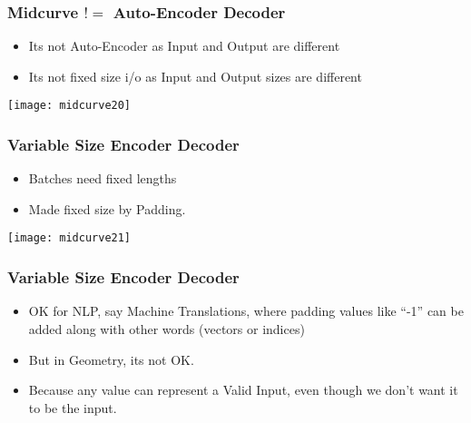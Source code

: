 \begin{frame}[fragile]\frametitle{Midcurve $!=$ Auto-Encoder Decoder}

	\begin{itemize}
	\item Its not Auto-Encoder as Input and Output are different
	\item Its not fixed size i/o as Input and Output sizes are different
	\end{itemize}
\begin{center}
\texttt{[image: midcurve20]}
\end{center}	
\end{frame}

\begin{frame}[fragile]\frametitle{Variable Size Encoder Decoder}

	\begin{itemize}
	\item Batches need fixed lengths
	\item Made fixed size by Padding.
	\end{itemize}
\begin{center}
\texttt{[image: midcurve21]}
\end{center}	
\end{frame}

\begin{frame}[fragile]\frametitle{Variable Size Encoder Decoder}

	\begin{itemize}
	\item OK for NLP, say Machine Translations, where padding values like ``-1'' can be added along with other words (vectors or indices)
	\item But in Geometry, its not OK. 
	\item Because any value can represent a Valid Input, even though we don’t want it to be the input.
	\end{itemize}
	
\end{frame}

